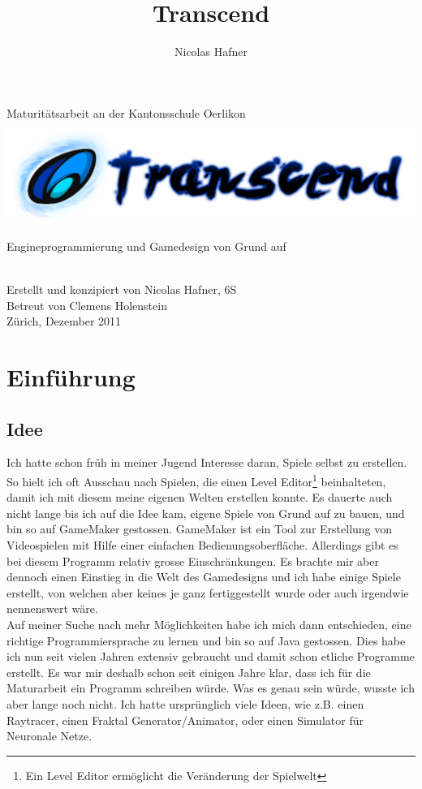 \documentclass[12pt,a4paper,titlepage]{article}
\author{Nicolas Hafner}
\title{Transcend}
\begin{document}
\begin{titlepage}
\begin{center}
	Maturitätsarbeit an der Kantonsschule Oerlikon  \\
	\vskip 2cm
	\includegraphics[keepaspectratio=true,scale=0.5,bb=0 0 1024 256]{logo.png}
	\vskip 0.5cm
	\begin{Large}Engineprogrammierung und Gamedesign von Grund auf\end{Large}\\
	\vskip 1cm
	Erstellt und konzipiert von Nicolas Hafner, 6S\\
	Betreut von Clemens Holenstein\\
	\vskip 0.5cm
	Zürich, Dezember 2011
\end{center}
\end{titlepage}
\setcounter{page}{0}
\tableofcontents
\listoffigures

\newpage

\section{Einführung}
	\subsection{Idee}
		Ich hatte schon früh in meiner Jugend Interesse daran, Spiele selbst zu erstellen.
		So hielt ich oft Ausschau nach Spielen, die einen Level Editor\footnote{Ein Level Editor ermöglicht die Veränderung der Spielwelt} beinhalteten, damit ich mit diesem meine eigenen Welten erstellen konnte.
		Es dauerte auch nicht lange bis ich auf die Idee kam, eigene Spiele von Grund auf zu bauen, und bin so auf GameMaker gestossen.
		GameMaker ist ein Tool zur Erstellung von Videospielen mit Hilfe einer einfachen Bedienungsoberfläche. Allerdings gibt es bei diesem Programm relativ grosse Einschränkungen.
		Es brachte mir aber dennoch einen Einstieg in die Welt des Gamedesigns und ich habe einige Spiele erstellt, von welchen aber keines je ganz fertiggestellt wurde oder auch irgendwie nennenswert wäre.\\
		
		Auf meiner Suche nach mehr Möglichkeiten habe ich mich dann entschieden, eine richtige Programmiersprache zu lernen und bin so auf Java gestossen. Dies habe ich nun seit vielen Jahren extensiv gebraucht und damit schon etliche Programme erstellt.
		Es war mir deshalb schon seit einigen Jahre klar, dass ich für die Maturarbeit ein Programm schreiben würde.
		Was es genau sein würde, wusste ich aber lange noch nicht. Ich hatte ursprünglich viele Ideen, wie z.B. einen Raytracer\footnotemark, einen Fraktal Generator/Animator\footnotemark, oder einen Simulator für Neuronale Netze\footnotemark.\\
		
\end{document}
